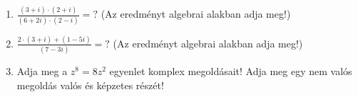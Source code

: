 \documentclass[11pt]{scrartcl}
\begin{document}
\begin{enumerate}
	\item \(\displaystyle
	      \frac{(3 + i) \cdot (2 + i)}{(6 + 2i) \cdot (2 - i)} = ?
	      \) (Az eredményt algebrai alakban adja meg!)

	\item \(\displaystyle
	      \frac{2 \cdot (3 + i) + (1 - 5i)}{(7 - 3i)} = ?
	      \) (Az eredményt algebrai alakban adja meg!)

	\item Adja meg a $z^8 = 8z^2$ egyenlet komplex megoldásait! Adja meg egy
	      nem valós megoldás valós és képzetes részét!
\end{enumerate}
\end{document}
